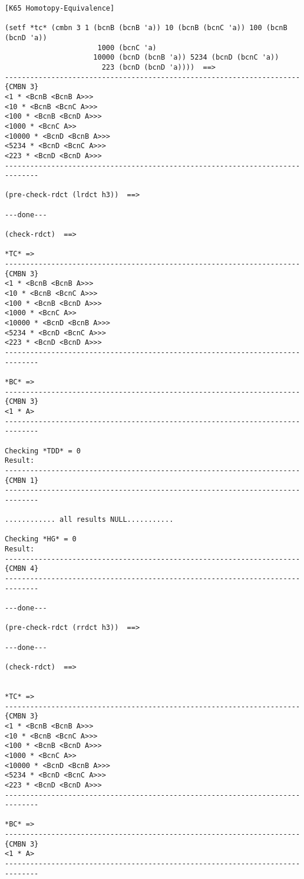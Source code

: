 {{\begin{verbatim}
[K65 Homotopy-Equivalence]

(setf *tc* (cmbn 3 1 (bcnB (bcnB 'a)) 10 (bcnB (bcnC 'a)) 100 (bcnB (bcnD 'a))
                      1000 (bcnC 'a)
                     10000 (bcnD (bcnB 'a)) 5234 (bcnD (bcnC 'a))
                       223 (bcnD (bcnD 'a))))  ==>
----------------------------------------------------------------------{CMBN 3}
<1 * <BcnB <BcnB A>>>
<10 * <BcnB <BcnC A>>>
<100 * <BcnB <BcnD A>>>
<1000 * <BcnC A>>
<10000 * <BcnD <BcnB A>>>
<5234 * <BcnD <BcnC A>>>
<223 * <BcnD <BcnD A>>>
------------------------------------------------------------------------------

(pre-check-rdct (lrdct h3))  ==>

---done---

(check-rdct)  ==>

*TC* =>
----------------------------------------------------------------------{CMBN 3}
<1 * <BcnB <BcnB A>>>
<10 * <BcnB <BcnC A>>>
<100 * <BcnB <BcnD A>>>
<1000 * <BcnC A>>
<10000 * <BcnD <BcnB A>>>
<5234 * <BcnD <BcnC A>>>
<223 * <BcnD <BcnD A>>>
------------------------------------------------------------------------------

*BC* =>
----------------------------------------------------------------------{CMBN 3}
<1 * A>
------------------------------------------------------------------------------

Checking *TDD* = 0
Result:
----------------------------------------------------------------------{CMBN 1}
------------------------------------------------------------------------------

............ all results NULL...........

Checking *HG* = 0
Result:
----------------------------------------------------------------------{CMBN 4}
------------------------------------------------------------------------------

---done---

(pre-check-rdct (rrdct h3))  ==>

---done---

(check-rdct)  ==>


*TC* =>
----------------------------------------------------------------------{CMBN 3}
<1 * <BcnB <BcnB A>>>
<10 * <BcnB <BcnC A>>>
<100 * <BcnB <BcnD A>>>
<1000 * <BcnC A>>
<10000 * <BcnD <BcnB A>>>
<5234 * <BcnD <BcnC A>>>
<223 * <BcnD <BcnD A>>>
------------------------------------------------------------------------------

*BC* =>
----------------------------------------------------------------------{CMBN 3}
<1 * A>
------------------------------------------------------------------------------


\end{verbatim}}}
